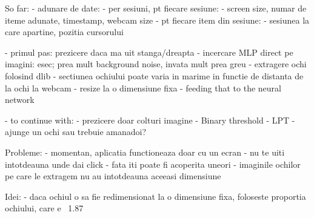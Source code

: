 So far:
    - adunare de date:
        - per sesiuni, pt fiecare sesiune:
            - screen size, numar de iteme adunate, timestamp, webcam size
        - pt fiecare item din sesiune:
            - sesiunea la care apartine, pozitia cursorului
    
    - primul pas: prezicere daca ma uit stanga/dreapta
    - incercare MLP direct pe imagini: esec; prea mult background noise, invata mult prea greu
    - extragere ochi folosind dlib
        - sectiunea ochiului poate varia in marime in functie de distanta de la ochi la webcam
        - resize la o dimensiune fixa
        - feeding that to the neural network
    
    - to continue with:
    - prezicere doar colturi imagine
    - Binary threshold
    - LPT
    - ajunge un ochi sau trebuie amanadoi?


Probleme:
    - momentan, aplicatia functioneaza doar cu un ecran
    - nu te uiti intotdeauna unde dai click
    - fata iti poate fi acoperita uneori
    - imaginile ochilor pe care le extragem nu au intotdeauna aceeasi dimensiune


Idei:
    - daca ochiul o sa fie redimensionat la o dimensiune fixa, foloseste proportia ochiului, care e ~1.87